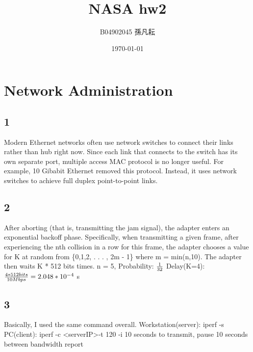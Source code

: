 \documentclass{article}
\title{NASA hw2}
\author{B04902045 孫凡耘}
\date{\today}
\begin{document}
\maketitle
    \section{Network Administration}
    \subsection{1}
    Modern Ethernet networks often use network switches to connect their links rather than hub right now. Since each link that connects to the switch has its own separate port, multiple access MAC protocol is no longer useful. For example, 10 Gibabit Ethernet removed this protocol. Instead, it uses network switches to achieve full duplex point-to-point links.
    \subsection{2}
    After aborting (that is, transmitting the jam signal), the adapter enters an exponential backoff phase. Specifically, when transmitting a given frame, after experiencing the nth collision in a row for this frame, the adapter chooses a value for K at random from \{0,1,2, . . . , 2m - 1\} where m = min(n,10). The adapter then waits K * 512 bits times.  \newline\newline
    n = 5, Probability: ${1 \over 32}$ \newline\newline
    Delay(K=4): ${4*512 bits\over 10 Mbps} = 2.048*10^{-4} $ s
    \newpage
    \subsection{3}
        Basically, I used the same command overall.\newline
        Workstation(server): iperf -s\newline
        PC(client): iperf -c \textless serverIP\textgreater \space\space -t 120 -i 10 seconds to transmit, pause 10 seconds between bandwidth report
\end{document}
